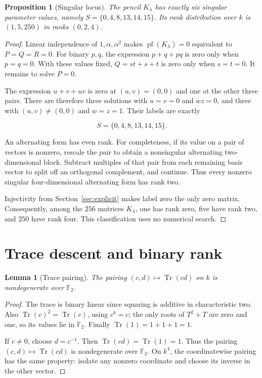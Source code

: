 \documentclass[11pt,a4paper]{article}
\newcommand{\F}{\mathbb F}
\DeclareMathOperator{\Tr}{Tr}
\newtheorem{lemma}[theorem]{Lemma}
\newtheorem{proposition}[theorem]{Proposition}
\theoremstyle{definition}
\begin{document}
\begin{proposition}[Singular locus]\label{prop:singular}The pencil $K_\lambda$ has exactly six singular parameter values, namely $S=\{0,4,8,13,14,15\}$. Its rank distribution over $k$ is $(1,5,250)$ in ranks $(0,2,4)$.\end{proposition}\begin{proof}

Linear independence of $1,\alpha ,\alpha ^{2}$ makes $\operatorname{pf}(K_{\lambda })=0$ equivalent to $P=Q=R=0$. For binary $p,q$, the expression $p+q+pq$ is zero only when $p=q=0$. With these values fixed, $Q=st+s+t$ is zero only when $s=t=0$. It remains to solve $P=0$.


The expression $u+v+uv$ is zero at $(u,v)=(0,0)$ and one at the other three pairs. There are therefore three solutions with $u=v=0$ and $wz=0$, and three with $(u,v)\ne (0,0)$ and $w=z=1$. Their labels are exactly


\begin{equation}\label{eq:41}
S=\{0,4,8,13,14,15\}.
\end{equation}

An alternating form has even rank. For completeness, if its value on a pair of vectors is nonzero, rescale the pair to obtain a nonsingular alternating two-dimensional block. Subtract multiples of that pair from each remaining basis vector to split off an orthogonal complement, and continue. Thus every nonzero singular four-dimensional alternating form has rank two.


Injectivity from Section~\ref{sec:explicit} makes label zero the only zero matrix. Consequently, among the $256$ matrices $K_{\lambda }$, one has rank zero, five have rank two, and $250$ have rank four. This classification uses no numerical search.


\end{proof}

\section{Trace descent and binary rank}\label{sec:trace}

\begin{lemma}[Trace pairing]\label{lem:trace}The pairing $(c,d)\mapsto\Tr(cd)$ on $k$ is nondegenerate over $\F_2$.\end{lemma}\begin{proof}

The trace is binary linear since squaring is additive in characteristic two. Also $\operatorname{Tr}(c)^{2}=\operatorname{Tr}(c)$, using $c^{8}=c$; the only roots of $T^{2}+T$ are zero and one, so its values lie in $\F_{2}$. Finally $\operatorname{Tr}(1)=1+1+1=1$.


If $c\ne 0$, choose $d=c^{-1}$. Then $\operatorname{Tr}(cd)=\operatorname{Tr}(1)=1$. Thus the pairing $(c,d) \mapsto  \operatorname{Tr}(cd)$ is nondegenerate over $\F_{2}$. On $k^{4}$, the coordinatewise pairing has the same property: isolate any nonzero coordinate and choose its inverse in the other vector.


\end{proof}
\end{document}

